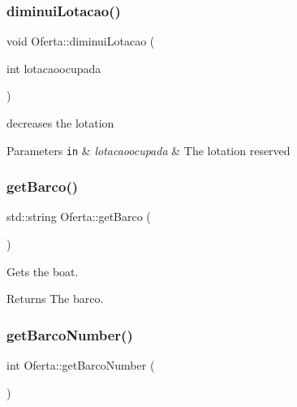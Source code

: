 \subsubsection{\texorpdfstring{diminui\+Lotacao()}{diminuiLotacao()}}
{\footnotesize\ttfamily void Oferta\+::diminui\+Lotacao (\begin{DoxyParamCaption}\item[{int}]{lotacaoocupada }\end{DoxyParamCaption})\hspace{0.3cm}{\ttfamily [inline]}}



decreases the lotation 


\begin{DoxyParams}[1]{Parameters}
\mbox{\tt in}  & {\em lotacaoocupada} & The lotation reserved \\
\hline
\end{DoxyParams}
\mbox{\label{classOferta_aaed9b5937f9f33d2980fcc13ac02132c}} 
\subsubsection{\texorpdfstring{get\+Barco()}{getBarco()}}
{\footnotesize\ttfamily std\+::string Oferta\+::get\+Barco (\begin{DoxyParamCaption}{ }\end{DoxyParamCaption})\hspace{0.3cm}{\ttfamily [inline]}}



Gets the boat. 

\begin{DoxyReturn}{Returns}
The barco. 
\end{DoxyReturn}
\mbox{\label{classOferta_abf0f062fa730edf6d4232926980b106c}} 
\subsubsection{\texorpdfstring{get\+Barco\+Number()}{getBarcoNumber()}}
{\footnotesize\ttfamily int Oferta\+::get\+Barco\+Number (\begin{DoxyParamCaption}{ }\end{DoxyParamCaption})}



